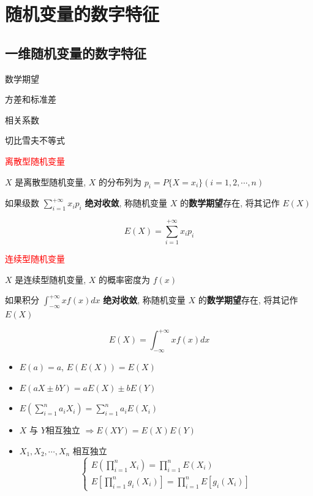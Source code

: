 \chapter{随机变量的数字特征}
\section{一维随机变量的数字特征}
\begin{introduction}
	\item 数学期望
	\item 方差和标准差
	\item 相关系数
	\item 切比雪夫不等式
\end{introduction}
\begin{definition}[数学期望]
	\textcolor{red}{离散型随机变量}

	$X$ 是离散型随机变量, $X$ 的分布列为 $p_{i} = P\{X = x_{i}\}(i = 1, 2, \cdots, n)$
	
	如果级数 $\sum\limits_{i = 1}^{+\infty} x_{i}p_{i}$ \textbf{绝对收敛}, 称随机变量 $X$ 的\textbf{数学期望}存在, 将其记作 $E(X)$
	
	$$E(X) = \sum\limits_{i = 1}^{+\infty}x_{i}p_{i}$$
	
	\textcolor{red}{连续型随机变量}

	$X$ 是连续型随机变量, $X$ 的概率密度为 $f(x)$
	
	如果积分 $\int_{-\infty}^{+\infty}xf(x)dx$ \textbf{绝对收敛}, 称随机变量 $X$ 的\textbf{数学期望}存在, 将其记作 $E(X)$
	
	$$E(X) = \int_{-\infty}^{+\infty}xf(x)dx$$
\end{definition}
\begin{corollary}[数学期望推论]
	\begin{itemize}
		\item $E(a) = a$, $E(E(X)) = E(X)$
		\item $E(aX \pm bY) = aE(X) \pm bE(Y)$
		\item $E\left(\sum\limits_{i = 1}^{n}a_{i}X_{i}\right) = \sum\limits_{i = 1}^{n}a_{i}E(X_{i})$
		\item $X$ 与 $Y$相互独立 $\Rightarrow E(XY) = E(X)E(Y)$ 
		\item $X_{1}, X_{2}, \cdots, X_{n}$ 相互独立
		$$\begin{cases}
			E\left(\prod\limits_{i = 1}^{n}X_{i}\right) = \prod\limits_{i = 1}^{n}E(X_{i})\\
			E\left[\prod\limits_{i = 1}^{n}g_{i}(X_{i})\right] = \prod\limits_{i = 1}^{n}E\left[g_{i}(X_{i})\right]
		\end{cases}$$
	\end{itemize}
\end{corollary}


